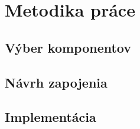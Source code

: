 \chapter{Metodika práce}

\section{Výber komponentov}
\section{Návrh zapojenia}
\section{Implementácia}
